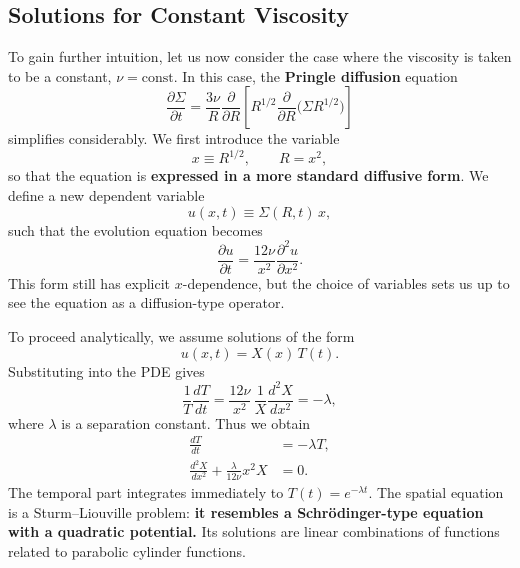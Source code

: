 \subsection*{Solutions for Constant Viscosity}

To gain further intuition, let us now consider the case where the viscosity is taken to be a constant, $\nu=\text{const}$. In this case, the \textbf{Pringle diffusion} equation 
\begin{equation}
    \frac{\partial \Sigma}{\partial t} = 
    \frac{3\nu}{R}\frac{\partial}{\partial R}
    \left[ R^{1/2}\frac{\partial}{\partial R}\big(\Sigma R^{1/2}\big)\right]
\end{equation}
simplifies considerably. We first introduce the variable
\[
x \equiv R^{1/2}, \qquad R = x^2,
\]
so that the equation is \textbf{expressed in a more standard diffusive form}. We define a new dependent variable
\[
u(x,t) \equiv \Sigma(R,t)\, x,
\]
such that the evolution equation becomes
\begin{equation}
    \frac{\partial u}{\partial t} = \frac{12\nu}{x^2}\frac{\partial^2 u}{\partial x^2}.
\end{equation}
This form still has explicit $x$-dependence, but the choice of variables sets us up to see the equation as a diffusion-type operator. 

\vspace{0.25cm}
\noindent
To proceed analytically, we assume solutions of the form
\[
u(x,t) = X(x)\,T(t).
\]
 Substituting into the PDE gives
\[
\frac{1}{T}\frac{dT}{dt} = \frac{12\nu}{x^2}\,\frac{1}{X}\frac{d^2X}{dx^2} = -\lambda,
\]
where $\lambda$ is a separation constant. Thus we obtain
\begin{align}
    \frac{dT}{dt} &= -\lambda T, \\
    \frac{d^2X}{dx^2} + \frac{\lambda}{12\nu}x^2 X &= 0.
\end{align}
The temporal part integrates immediately to $T(t) = e^{-\lambda t}$. The spatial equation is a Sturm--Liouville problem: \textbf{it resembles a Schrödinger-type equation with a quadratic potential.} Its solutions are linear combinations of functions related to parabolic cylinder functions.


